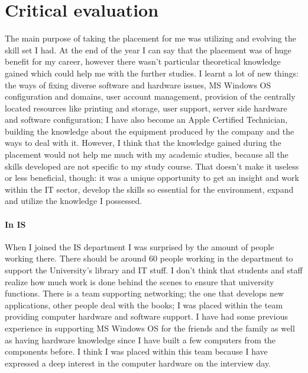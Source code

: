 \documentclass[10pt,a4paper,headinclude=true,twoside]{report}
\begin{document}
\chapter{Critical evaluation}
The main purpose of taking the placement for me was utilizing and evolving the skill set I had. At the end of the year I can say that the placement was of huge benefit for my career, however there wasn't particular theoretical knowledge gained which could help me with the further studies. I learnt a lot of new things: the ways of fixing diverse software and hardware issues, MS Windows OS configuration and domains, user account management, provision of the centrally located resources like printing and storage, user support, server side hardware and software configuration; I have also become an Apple Certified Technician, building the knowledge about the equipment produced by the company and the ways to deal with it. However, I think that the knowledge gained during the placement would not help me much with my academic studies, because all the skills developed are not specific to my study course. That doesn't make it useless or less beneficial, though: it was a unique opportunity to get an insight and work within the IT sector, develop the skills so essential for the environment, expand and utilize the knowledge I possessed.
\subsubsection{In IS}
When I joined the IS department I was surprised by the amount of people working there. There should be around 60 people working in the department to support the University's library and IT stuff. I don't think that students and staff realize how much work is done behind the scenes to ensure that university functions. There is a team supporting networking; the one that develops new applications, other people deal with the books; I was placed within the team providing computer hardware and software support. I have had some previous experience in supporting MS Windows OS for the friends and the family as well as having hardware knowledge since I have built a few computers from the components before. I think I was placed within this team because I have expressed a deep interest in the computer hardware on the interview day.
\end{document}
